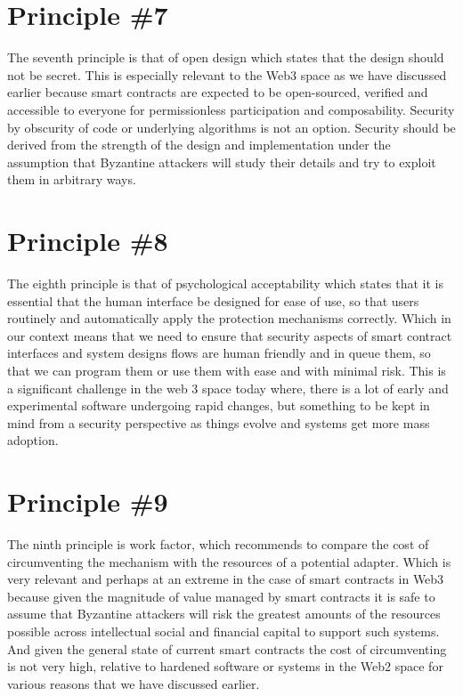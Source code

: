 \section{Principle \#7}
The seventh principle is that of open design which states that the design should not be secret. This is especially relevant to the Web3 space as we have discussed earlier because smart contracts are expected to be open-sourced, verified and accessible to everyone for permissionless participation and composability. Security by obscurity of code or underlying algorithms is not an option. Security should be derived from the strength of the design and implementation under the assumption that Byzantine attackers will study their details and try to exploit them in arbitrary ways.

\section{Principle \#8}
The eighth principle is that of psychological acceptability which states that it is essential that the human interface be designed for ease of use, so that users routinely and automatically apply the protection mechanisms correctly. Which in our context means that we need to ensure that security aspects of smart contract interfaces and system designs flows are human friendly and in queue them, so that we can program them or use them with ease and with minimal risk. This is a significant challenge in the web 3 space today where, there is a lot of early and experimental software undergoing rapid changes, but something to be kept in mind from a security perspective as things evolve and systems get more mass adoption.

\section{Principle \#9}
The ninth principle is work factor, which recommends to compare the cost of circumventing the mechanism with the resources of a potential adapter. Which is very relevant and perhaps at an extreme in the case of smart contracts in Web3 because given the magnitude of value managed by smart contracts it is safe to assume that Byzantine attackers will risk the greatest amounts of the resources possible across intellectual social and financial capital to support such systems. And given the general state of current smart contracts the cost of circumventing is not very high, relative to hardened software or systems in the Web2 space for various reasons that we have discussed earlier. \\

